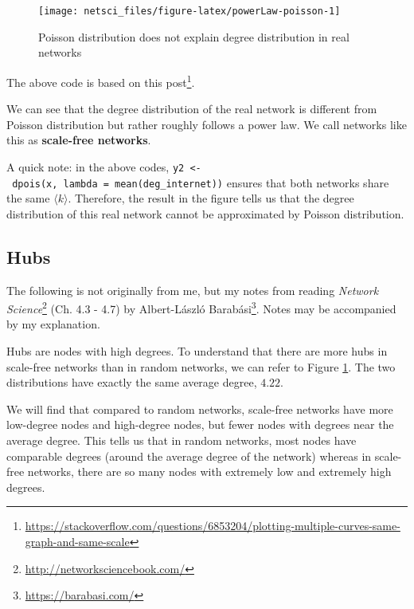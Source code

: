 \documentclass[
]{krantz}
\makeatletter
\renewcommand{\href}[2]{#2\footnote{\url{#1}}}
\newenvironment{kframe}{%
\medskip{}
\setlength{\fboxsep}{.8em}
 \def\at@end@of@kframe{}%
 \ifinner\ifhmode%
  \def\at@end@of@kframe{\end{minipage}}%
  \begin{minipage}{\columnwidth}%
 \fi\fi%
 \def\FrameCommand##1{\hskip\@totalleftmargin \hskip-\fboxsep
 \colorbox{shadecolor}{##1}\hskip-\fboxsep
     \hskip-\linewidth \hskip-\@totalleftmargin \hskip\columnwidth}%
 \MakeFramed {\advance\hsize-\width
   \@totalleftmargin\z@ \linewidth\hsize
   \@setminipage}}%
 {\par\unskip\endMakeFramed%
 \at@end@of@kframe}
\newenvironment{rmdblock}[1]
  {
  \begin{itemize}
  \renewcommand{\labelitemi}{
    \raisebox{-.7\height}[0pt][0pt]{
      {\setkeys{Gin}{width=3em,keepaspectratio}\texttt{[image: images/\#1]}}
    }
  }
  \setlength{\fboxsep}{1em}
  \begin{kframe}
  \item
  }
  {
  \end{kframe}
  \end{itemize}
  }
\newenvironment{rmdnote}
  {\begin{rmdblock}{note}}
  {\end{rmdblock}}
\makeatother
\begin{document}
\begin{figure}

{\centering \texttt{[image: netsci\_files/figure-latex/powerLaw-poisson-1]} 

}

\caption{Poisson distribution does not explain degree distribution in real networks}\label{fig:powerLaw-poisson}
\end{figure}

The above code is based on \href{https://stackoverflow.com/questions/6853204/plotting-multiple-curves-same-graph-and-same-scale}{this post}.

We can see that the degree distribution of the real network is different from Poisson distribution but rather roughly follows a power law. We call networks like this as \textbf{scale-free networks}.

A quick note: in the above codes, \texttt{y2\ \textless{}-\ dpois(x,\ lambda\ =\ mean(deg\_internet))} ensures that both networks share the same \(\langle k \rangle\). Therefore, the result in the figure tells us that the degree distribution of this real network cannot be approximated by Poisson distribution.

\hypertarget{hubs}{%
\subsection{Hubs}\label{hubs}}

\begin{rmdnote}
The following is not originally from me, but my notes from reading \href{http://networksciencebook.com/}{\emph{Network Science}} (Ch. 4.3 - 4.7) by \href{https://barabasi.com/}{Albert-László Barabási}. Notes may be accompanied by my explanation.
\end{rmdnote}

Hubs are nodes with high degrees. To understand that there are more hubs in scale-free networks than in random networks, we can refer to Figure \ref{fig:powerLaw-poisson}. The two distributions have exactly the same average degree, \(4.22\).

We will find that compared to random networks, scale-free networks have more low-degree nodes and high-degree nodes, but fewer nodes with degrees near the average degree. This tells us that in random networks, most nodes have comparable degrees (around the average degree of the network) whereas in scale-free networks, there are so many nodes with extremely low and extremely high degrees.
\end{document}

